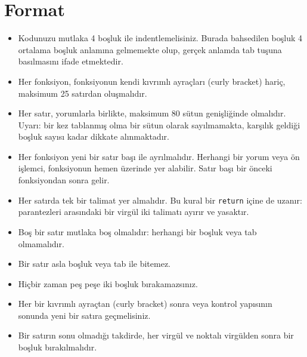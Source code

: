 \documentclass{42-en}
\begin{document}
    \section{Format}

            \begin{itemize}

                \item Kodunuzu mutlaka 4 boşluk ile indentlemelisiniz. Burada bahsedilen boşluk 4 ortalama boşluk anlamına
gelmemekte olup, gerçek anlamda tab tuşuna basılmasını ifade etmektedir.

                \item Her fonksiyon, fonksiyonun kendi kıvrımlı ayraçları (curly bracket) hariç, maksimum 25 satırdan oluşmalıdır.

                \item Her satır, yorumlarla birlikte, maksimum 80 sütun genişliğinde olmalıdır. Uyarı: bir kez tablanmış olma bir
sütun olarak sayılmamakta, karşılık geldiği boşluk sayısı kadar dikkate alınmaktadır.

                \item Her fonksiyon yeni bir satır başı ile ayrılmalıdır. Herhangi bir yorum veya ön işlemci, fonksiyonun hemen
üzerinde yer alabilir. Satır başı bir önceki fonksiyondan sonra gelir.

                \item Her satırda tek bir talimat yer almalıdır. Bu kural bir \texttt{return} içine de
uzanır: parantezleri arasındaki bir virgül iki talimatı ayırır ve yasaktır.

                \item Boş bir satır mutlaka boş olmalıdır: herhangi bir boşluk veya tab olmamalıdır.

                \item Bir satır asla boşluk veya tab ile bitemez.

                \item Hiçbir zaman peş peşe iki boşluk bırakamazsınız.

                \item Her bir kıvrımlı ayraçtan (curly bracket) sonra veya kontrol yapısının sonunda yeni bir satıra geçmelisiniz.

                \item Bir satırın sonu olmadığı takdirde, her virgül ve noktalı virgülden sonra bir boşluk bırakılmalıdır.


\end{itemize}
\end{document}
